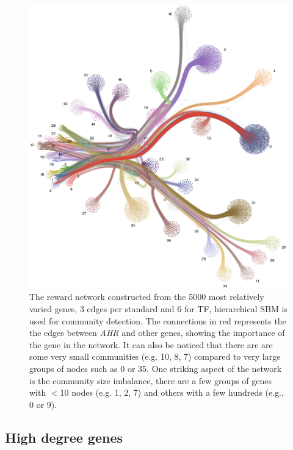 
\begin{figure}[H]    
    \centering
    \includegraphics[width=1.0\textwidth,height=1.0\textheight,keepaspectratio]{Sections/Network_II/resources/reward/sigmoid_5K_Net_II_label_2.png}
    \caption[Reward network from healthy dataset with mutation burden]{The reward network constructed from the 5000 most relatively varied genes, 3 edges per standard and 6 for TF, hierarchical SBM is used for community detection. The connections in red represents the the edges between \textit{AHR} and other genes, showing the importance of the gene in the network. It can also be noticed that there are are some very small communities (e.g. 10, 8, 7) compared to very large groups of nodes such as 0 or 35. One striking aspect of the network is the community size imbalance, there are a few groups of genes with $<$10 nodes (e.g. 1, 2, 7) and others with a few hundreds (e.g., 0 or 9).}
    \label{fig:N_II:reward_net}
\end{figure}


\subsection{High degree genes} \label{s:N_II:high_conn}

